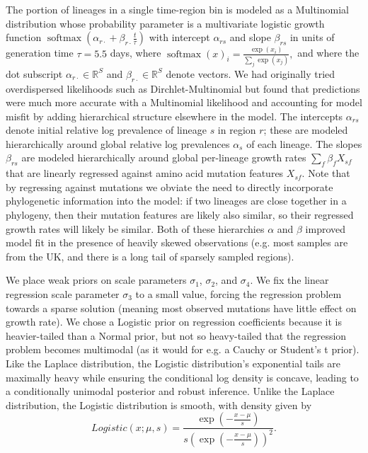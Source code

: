 \documentclass[12pt]{article}
\newcommand \blank {{\,\pmb\cdot\,}}
\begin{document}
The portion of lineages in a single time-region bin is modeled as a Multinomial distribution whose probability parameter is a multivariate logistic growth function $\operatorname{softmax}(\alpha_{r\blank} + \beta_{r\blank}\frac t\tau)$ with intercept $\alpha_{rs}$ and slope $\beta_{rs}$ in units of generation time $\tau=5.5$ days, where
$
  \operatorname{softmax}(x)_i = \frac {\exp(x_i)} {\sum_j \exp(x_j)},
$
and where the dot subscript $\alpha_{r\blank}\in\mathbb R^S$ and $\beta_{r\blank}\in\mathbb R^S$ denote vectors.
We had originally tried overdispersed likelihoods such as Dirchlet-Multinomial but found that predictions were much more accurate with a Multinomial likelihood and accounting for model misfit by adding hierarchical structure elsewhere in the model.
The intercepts $\alpha_{rs}$ denote initial relative log prevalence of lineage $s$ in region $r$; these are modeled hierarchically around global relative log prevalences $\alpha_s$ of each lineage.
The slopes $\beta_{rs}$ are modeled hierarchically around global per-lineage growth rates $\sum_f \beta_f X_{sf}$ that are linearly regressed against amino acid mutation features $X_{sf}$.
Note that by regressing against mutations we obviate the need to directly incorporate phylogenetic information into the model: if two lineages are close together in a phylogeny, then their mutation features are likely also similar, so their regressed growth rates will likely be similar.
Both of these hierarchies $\alpha$ and $\beta$ improved model fit in the presence of heavily skewed observations (e.g. most samples are from the UK, and there is a long tail of sparsely sampled regions).

We place weak priors on scale parameters $\sigma_1$, $\sigma_2$, and $\sigma_4$.
We fix the linear regression scale parameter $\sigma_3$ to a small value, forcing the regression problem towards a sparse solution (meaning most observed mutations have little effect on growth rate).
We chose a Logistic prior on regression coefficients because it is heavier-tailed than a Normal prior, but not so heavy-tailed that the regression problem becomes multimodal (as it would for e.g. a Cauchy or Student's t prior).
Like the Laplace distribution, the Logistic distribution's exponential tails are maximally heavy while ensuring the conditional log density is concave, leading to a conditionally unimodal posterior and robust inference.
Unlike the Laplace distribution, the Logistic distribution is smooth, with density given by
$$
Logistic(x;\mu,s) = \frac {\exp(-\frac{x-\mu}s)}{s(\exp(-\frac{x-\mu}s))^2}.
$$
\end{document}
